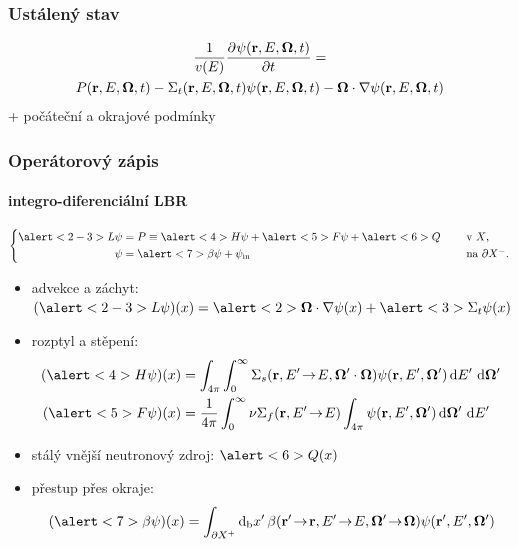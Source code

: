 \begin{frame}
  \frametitle{Ustálený stav}
  
    \begin{multline*}
    \frac{1}{v(E)} {\frac{\partial^{}\psi(\mathbf{r},E,\mathbf{\Omega},t)}{\partial t^{}}} = \\
    {P(\mathbf{r},E,\mathbf{\Omega},t)}
    - {\Sigma_t(\mathbf{r},E,\mathbf{\Omega},t)\psi(\mathbf{r},E,\mathbf{\Omega},t)}
    - {\mathbf{\Omega}\cdot\nabla\psi(\mathbf{r},E,\mathbf{\Omega},t)}
    \end{multline*}
    + počáteční a okrajové podmínky

\end{frame}

\begin{frame}
  \frametitle{Operátorový zápis}
  \framesubtitle{integro-diferenciální LBR}
  
$$
  \left\{
    \begin{aligned}
       \alert<2-3>{L\angflux} &= P \equiv \alert<4>{H\angflux} + \alert<5>{F\angflux} + \alert<6>{Q}\quad &&\mbox{ v $X$,}\\
	  \angflux  &= \alert<7>{\beta\angflux} + \angfluxin\quad   &&\mbox{ na $\pX[-]$.}
    \end{aligned}
  \right.
$$
\begin{itemize}
	\item<2-> \alert<2>{advekce} a \alert<3>{záchyt}: $(\alert<2-3>{L\angflux})(x) = \alert<2>{\bomega\cdot\nabla\angflux(x)} + \alert<3>{\Sigma_t\angflux(x)}$
	\item<4-> \alert<4>{rozptyl} a \alert<5>{stěpení}: 
	    \begin{align*}
		      (\alert<4>{H\angflux})(x) &= \aintp{\eintp{\Sigma_s(\br, E'\ra E, \bomega'\cdot\bomega)\angflux(\br,E',\bomega')}}\\
		      (\alert<5>{F\angflux})(x) &= \frac{1}{4\pi}\eintp{\nu\Sigma_f(\br, E'\ra E)\aintp{\angflux(\br,E',\bomega')}}
      \end{align*}
	\item<6-> \alert<6>{stálý vnější neutronový zdroj:} $\alert<6>{Q(x)}$
	\item<7-> \alert<7>{přestup přes okraje:}
	$$
		(\alert<7>{\beta\angflux})(x) = \bndint[']{\pX[+]}\beta(\br'\ra \br, E'\ra E, \bomega'\ra\bomega)\angflux(\br', E', \bomega')
  $$
\end{itemize}

\end{frame}

